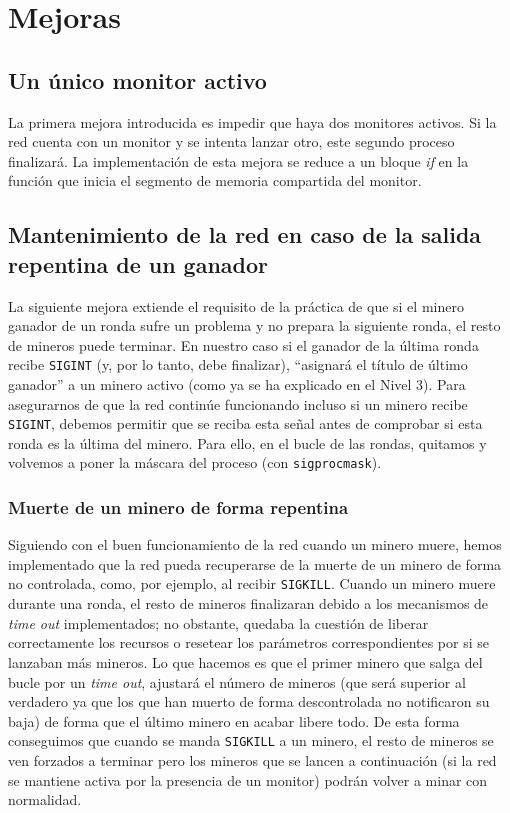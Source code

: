 \documentclass{article}
\begin{document}
\section*{Mejoras}

\subsection*{Un único monitor activo}
La primera mejora introducida es impedir que haya dos monitores activos. Si la red cuenta con un monitor y se intenta lanzar otro, este segundo proceso finalizará. La implementación de esta mejora se reduce a un bloque \emph{if} en la función que inicia el segmento de memoria compartida del monitor.

\subsection*{Mantenimiento de la red en caso de la salida repentina de un ganador}
La siguiente mejora extiende el requisito de la práctica de que si el minero ganador de un ronda sufre un problema y no prepara la siguiente ronda, el resto de mineros puede terminar. En nuestro caso si el ganador de la última ronda recibe \texttt{SIGINT} (y, por lo tanto, debe finalizar), ``asignará el título de último ganador'' a un minero activo (como ya se ha explicado en el Nivel 3). Para asegurarnos de que la red continúe funcionando incluso si un minero recibe \texttt{SIGINT}, debemos permitir que se reciba esta señal antes de comprobar si esta ronda es la última del minero. Para ello, en el bucle de las rondas, quitamos y volvemos a poner la máscara del proceso (con \texttt{sigprocmask}). 

\subsubsection*{Muerte de un minero de forma repentina}
Siguiendo con el buen funcionamiento de la red cuando un minero muere, hemos implementado que la red pueda recuperarse de la muerte de un minero de forma no controlada, como, por ejemplo, al recibir \texttt{SIGKILL}. Cuando un minero muere durante una ronda, el resto de mineros finalizaran debido a los mecanismos de \textit{time out} implementados; no obstante, quedaba la cuestión de liberar correctamente los recursos o resetear los parámetros correspondientes por si se lanzaban más mineros. Lo que hacemos es que el primer minero que salga del bucle por un \textit{time out}, ajustará el número de mineros (que será superior al verdadero ya que los que han muerto de forma descontrolada no notificaron su baja) de forma que el último minero en acabar libere todo. De esta forma conseguimos que cuando se manda \texttt{SIGKILL} a un minero, el resto de mineros se ven forzados a terminar pero los mineros que se lancen a continuación (si la red se mantiene activa por la presencia de un monitor) podrán volver a minar con normalidad.
\end{document}
